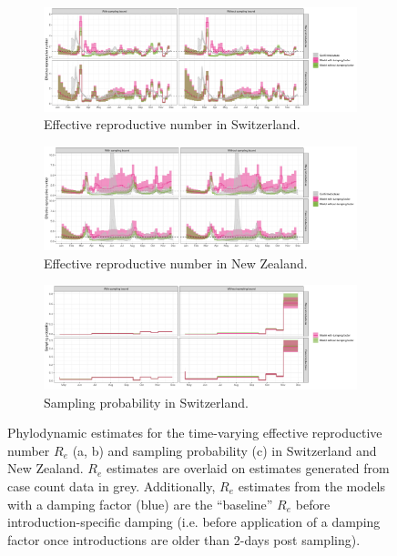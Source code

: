 \documentclass[9pt,twoside,lineno]{pnas-new}
\begin{document}
\begin{figure}[tbhp]
\centering
\begin{subfigure}[b]{\textwidth}
\includegraphics[width=\linewidth]{figures/CHE_Re.pdf}
\caption{Effective reproductive number in Switzerland.}
\end{subfigure}
\begin{subfigure}[b]{\textwidth}
\includegraphics[width=\linewidth]{figures/NZL_Re.pdf}
\caption{Effective reproductive number in New Zealand.}
\end{subfigure}
\begin{subfigure}[b]{\textwidth}
\includegraphics[width=\linewidth]{figures/CHE_sampProp.pdf}
\caption{Sampling probability in Switzerland.}
\end{subfigure}
\caption{Phylodynamic estimates for the time-varying effective reproductive number $R_e$ (a, b) and sampling probability (c) in Switzerland and New Zealand. $R_e$ estimates are overlaid on estimates generated from case count data \cite{huisman_re_preprint} in grey. Additionally, $R_e$ estimates from the models with a damping factor (blue) are the ``baseline'' $R_e$ before introduction-specific damping (i.e. before application of a damping factor once introductions are older than 2-days post sampling).}  
\label{fig:ReSampProbResults}
\end{figure}
\end{document}
